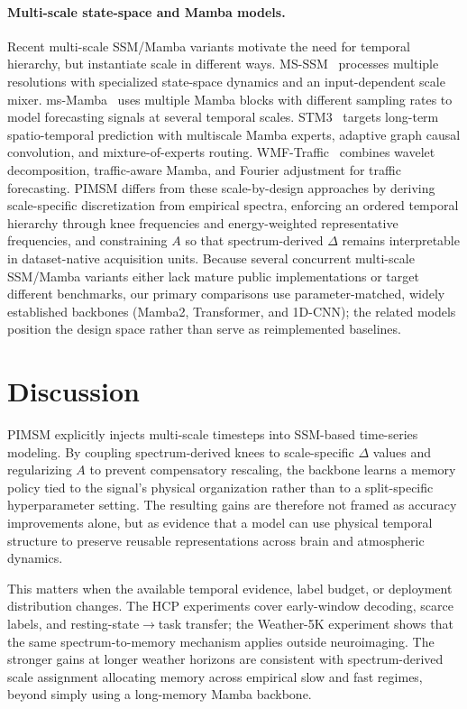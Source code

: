 \documentclass{article}
\begin{document}
\paragraph{Multi-scale state-space and Mamba models.}
Recent multi-scale SSM/Mamba variants motivate the need for temporal hierarchy, but instantiate scale in different ways.
MS-SSM~\citep{Karami2025MSSSMAM} processes multiple resolutions with specialized state-space dynamics and an input-dependent scale mixer.
ms-Mamba~\citep{karadag2025ms} uses multiple Mamba blocks with different sampling rates to model forecasting signals at several temporal scales.
STM3~\citep{chen2025stm3} targets long-term spatio-temporal prediction with multiscale Mamba experts, adaptive graph causal convolution, and mixture-of-experts routing.
WMF-Traffic~\citep{li2025multi} combines wavelet decomposition, traffic-aware Mamba, and Fourier adjustment for traffic forecasting.
PIMSM differs from these scale-by-design approaches by deriving scale-specific discretization from empirical spectra, enforcing an ordered temporal hierarchy through knee frequencies and energy-weighted representative frequencies, and constraining $A$ so that spectrum-derived $\Delta$ remains interpretable in dataset-native acquisition units.
Because several concurrent multi-scale SSM/Mamba variants either lack mature public implementations or target different benchmarks, our primary comparisons use parameter-matched, widely established backbones (Mamba2, Transformer, and 1D-CNN); the related models position the design space rather than serve as reimplemented baselines.

\section{Discussion}
\label{sec:discussion}

PIMSM explicitly injects multi-scale timesteps into SSM-based time-series modeling. By coupling spectrum-derived knees to scale-specific $\Delta$ values and regularizing $A$ to prevent compensatory rescaling, the backbone learns a memory policy tied to the signal's physical organization rather than to a split-specific hyperparameter setting. The resulting gains are therefore not framed as accuracy improvements alone, but as evidence that a model can use physical temporal structure to preserve reusable representations across brain and atmospheric dynamics.

This matters when the available temporal evidence, label budget, or deployment distribution changes. The HCP experiments cover early-window decoding, scarce labels, and resting-state$\rightarrow$task transfer; the Weather-5K experiment shows that the same spectrum-to-memory mechanism applies outside neuroimaging. The stronger gains at longer weather horizons are consistent with spectrum-derived scale assignment allocating memory across empirical slow and fast regimes, beyond simply using a long-memory Mamba backbone.
\end{document}
